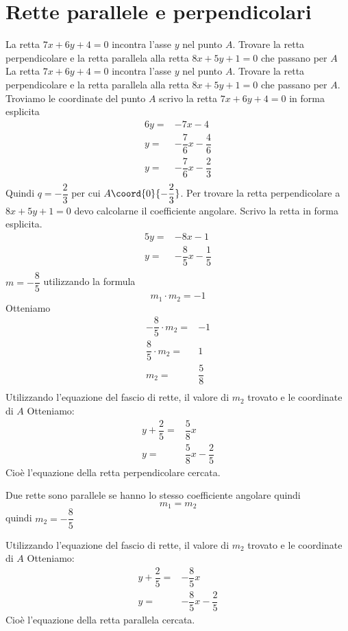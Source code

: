 \section{Rette parallele e perpendicolari}
\begin{exercise}
	La retta $7x+6y+4=0$ incontra l'asse $y$ nel punto $A$. Trovare la retta perpendicolare e la retta parallela alla retta $8x+5y+1=0$ che passano per $A$
	\tcblower
	La retta $7x+6y+4=0$ incontra l'asse $y$ nel punto $A$. Trovare la retta perpendicolare e la retta parallela alla retta $8x+5y+1=0$ che passano per $A$.
	Troviamo le coordinate del punto $A$ scrivo la retta  $7x+6y+4=0$ in forma esplicita
	\begin{align*}
	6y=&-7x-4\\
	y=&-\dfrac{7}{6}x-\dfrac{4}{6}\\
	y=&-\dfrac{7}{6}x-\dfrac{2}{3}\\
	\end{align*}
	Quindi $q=-\dfrac{2}{3}$ per cui $A\coord{0}{-\dfrac{2}{3}}$. Per trovare la retta perpendicolare a $8x+5y+1=0$ devo calcolarne il coefficiente angolare.
	Scrivo la retta in forma esplicita.
		\begin{align*}
		5y=&-8x-1\\
		y=&-\dfrac{8}{5}x-\dfrac{1}{5}\\
		\end{align*}
	$m=-\dfrac{8}{5}$ utilizzando la formula \[m_1\cdot m_2=-1\] Otteniamo
	\begin{align*}
-\dfrac{8}{5}\cdot m_2=&-1\\
\dfrac{8}{5}\cdot m_2=&1\\
 m_2=&\dfrac{5}{8}\\
	\end{align*}
	Utilizzando l'equazione del fascio di rette, il valore di $m_2$ trovato e le coordinate di $A$ Otteniamo:
	\begin{align*}
	y+\dfrac{2}{5}=&\dfrac{5}{8}x\\
		y=&\dfrac{5}{8}x-\dfrac{2}{5}
	\end{align*}
	Cioè l'equazione della retta perpendicolare cercata.
	
	Due rette sono parallele se hanno lo stesso coefficiente angolare quindi \[m_1=m_2 \]
	quindi $m_2=-\dfrac{8}{5}$ 
	
	Utilizzando l'equazione del fascio di rette, il valore di $m_2$ trovato e le coordinate di $A$ Otteniamo:
		\begin{align*}
		y+\dfrac{2}{5}=&-\dfrac{8}{5}x\\
		y=&-\dfrac{8}{5}x-\dfrac{2}{5}
		\end{align*}
	Cioè l'equazione della retta parallela cercata.		
	\begin{center}

\end{center}
\end{exercise}
